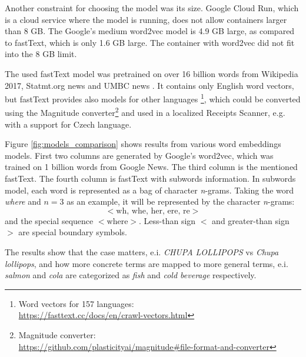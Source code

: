 \documentclass[
  digital, %
  table,   %
  oneside, %
  lof,     %
  lot,     %
]{fithesis3}
\begin{document}
Another constraint for choosing the model was its size. Google Cloud Run, which is a cloud service where the model is running, does not allow containers larger than 8 GB. The Google's medium word2vec model is 4.9 GB large, as compared to fastText, which is only 1.6 GB large. The container with word2vec did not fit into the 8 GB limit.

The used fastText model was pretrained on over 16 billion words from Wikipedia 2017, Statmt.org news and UMBC news \cite{Mikolov2018Advances}. It contains only English word vectors, but fastText provides also models for other languages \footnote{Word vectors for 157 languages:\\ \url{https://fasttext.cc/docs/en/crawl-vectors.html}}, which could be converted using the Magnitude converter\footnote{Magnitude converter:\\ \url{https://github.com/plasticityai/magnitude\#file-format-and-converter}} and used in a localized Receipts Scanner, e.g. with a support for Czech language.

Figure \ref{fig:models_comparison} shows results from various word embeddings models. First two columns are generated by Google's word2vec, which was trained on 1 billion words from Google News. The third column is the mentioned fastText. The fourth column is fastText with subwords information. In subwords model, each word is represented as a bag of character \textit{n}-grams. Taking the
word \textit{where} and $n = 3$ as an example, it will be
represented by the character \textit{n}-grams:
\[
<\text{wh, whe, her, ere, re}>
\]
and the special sequence $<\text{where}>$. Less-than sign $<$ and greater-than sign $>$ are special boundary symbols. \cite{BojanowskiEtal2017Enriching}

The results show that the case matters, e.i. \textit{CHUPA LOLLIPOPS} vs \textit{Chupa lollipops}, and how more concrete terms are mapped to more general terms, e.i. \textit{salmon} and \textit{cola} are categorized as \textit{fish} and \textit{cold beverage} respectively.
\end{document}
